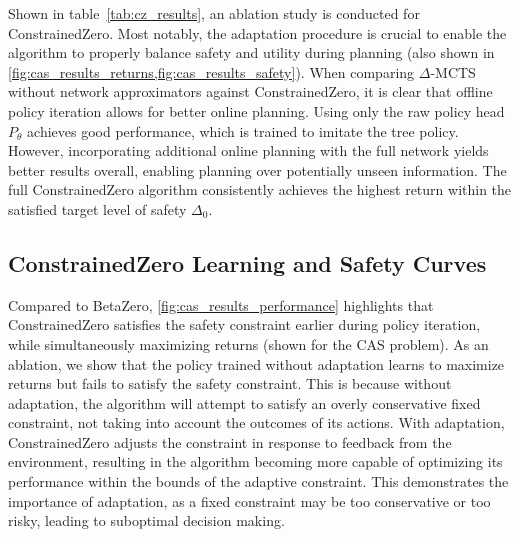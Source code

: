 Shown in table~\ref{tab:cz_results}, an ablation study is conducted for ConstrainedZero.
Most notably, the adaptation procedure is crucial to enable the algorithm to properly balance safety and utility during planning (also shown in \cref{fig:cas_results_returns,fig:cas_results_safety}).
When comparing $\Delta$-MCTS without network approximators against ConstrainedZero, it is clear that offline policy iteration allows for better online planning.
Using only the raw policy head $P_\theta$ achieves good performance, which is trained to imitate the tree policy.
However, incorporating additional online planning with the full network yields better results overall, enabling planning over potentially unseen information.
The full ConstrainedZero algorithm consistently achieves the highest return within the satisfied target level of safety $\Delta_0$.

\subsection{ConstrainedZero Learning and Safety Curves}

Compared to BetaZero, \cref{fig:cas_results_performance} highlights that ConstrainedZero satisfies the safety constraint earlier during policy iteration, while simultaneously maximizing returns (shown for the CAS problem).
As an ablation, we show that the policy trained without adaptation learns to maximize returns but fails to satisfy the safety constraint.
This is because without adaptation, the algorithm will attempt to satisfy an overly conservative fixed constraint, not taking into account the outcomes of its actions.
With adaptation, ConstrainedZero adjusts the constraint in response to feedback from the environment, resulting in the algorithm becoming more capable of optimizing its performance within the bounds of the adaptive constraint.
This demonstrates the importance of adaptation, as a fixed constraint may be too conservative or too risky, leading to suboptimal decision making.


